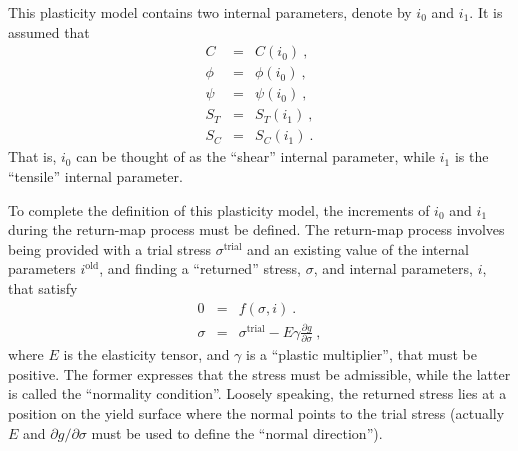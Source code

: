 \documentclass[]{scrreprt}
\begin{document}
This plasticity model contains two internal parameters, denote by
$i_{0}$ and $i_{1}$.   It is assumed
that
\begin{eqnarray}
C & = & C(i_{0}) \ , \\
\phi & = & \phi(i_{0}) \ , \\
\psi & = & \psi(i_{0}) \ , \\
S_{T} & = & S_{T}(i_{1}) \ , \\
S_{C} & = & S_{C}(i_{1}) \ .
\end{eqnarray}
That is, $i_{0}$ can be thought of as the ``shear'' internal parameter,
while $i_{1}$ is the ``tensile'' internal parameter.

To complete the definition of this plasticity model, the increments of
$i_{0}$ and $i_{1}$ during the return-map process must be defined.
The return-map process involves being provided with a trial stress
$\sigma^{\mathrm{trial}}$ and an existing value of the internal
parameters $i^{\mathrm{old}}$, and finding a ``returned'' stress,
$\sigma$, and internal parameters, $i$, that satisfy
\begin{eqnarray}
0 & = & f(\sigma, i) \ . \\\label{f.zero.return}
\sigma & = & \sigma^{\mathrm{trial}} - E\gamma \frac{\partial
  g}{\partial\sigma} \ ,
\end{eqnarray}
where $E$ is the elasticity tensor, and $\gamma$ is a ``plastic
multiplier'', that must be positive.  The former expresses that the
stress must be admissible, while the latter is called the ``normality
condition''.  Loosely speaking, the returned stress lies at a position
on the yield surface where the normal points to the trial stress
(actually $E$ and $\partial g/\partial\sigma$ must be used to define
the ``normal direction'').
\end{document}
